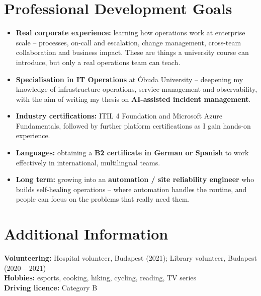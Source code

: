 \documentclass[a4paper,11pt]{article}
\newcommand{\resumeItem}[1]{\item\small{#1\vspace{-2pt}}}
\begin{document}
\section{Professional Development Goals}
  \begin{itemize}[leftmargin=0.3in, itemsep=1pt]
    \resumeItem{\textbf{Real corporate experience:} learning how operations work at enterprise scale -- processes,
      on-call and escalation, change management, cross-team collaboration and business impact. These are things a
      university course can introduce, but only a real operations team can teach.}
    \resumeItem{\textbf{Specialisation in IT Operations} at Óbuda University -- deepening my knowledge of infrastructure
      operations, service management and observability, with the aim of writing my thesis on \textbf{AI-assisted
      incident management}.}
    \resumeItem{\textbf{Industry certifications:} ITIL 4 Foundation and Microsoft Azure Fundamentals, followed by
      further platform certifications as I gain hands-on experience.}
    \resumeItem{\textbf{Languages:} obtaining a \textbf{B2 certificate in German or Spanish} to work effectively in
      international, multilingual teams.}
    \resumeItem{\textbf{Long term:} growing into an \textbf{automation / site reliability engineer} who builds
      self-healing operations -- where automation handles the routine, and people can focus on the problems that
      really need them.}
  \end{itemize}
  \vspace{-4pt}

\section{Additional Information}
 \begin{itemize}[leftmargin=0.15in, label={}]
    \small{\item{
     \textbf{Volunteering:} Hospital volunteer, Budapest (2021); Library volunteer, Budapest (2020 -- 2021) \\
     \textbf{Hobbies:} esports, cooking, hiking, cycling, reading, TV series \\
     \textbf{Driving licence:} Category B
    }}
 \end{itemize}
\end{document}
